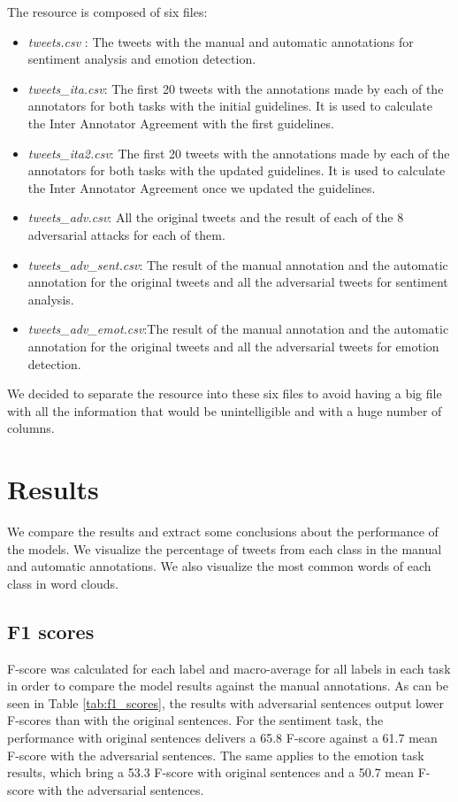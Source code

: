 \documentclass[11pt,a4paper]{article}
\begin{document}
The resource is composed of six files:
\begin{itemize}
    \item \textit{tweets.csv }: The tweets with the manual and automatic annotations for sentiment analysis and emotion detection.
    \item \textit{tweets\_ita.csv}: The first 20 tweets with the annotations made by each of the annotators for both tasks with the initial guidelines. It is used to calculate the Inter Annotator Agreement with the first guidelines.
    \item \textit{tweets\_ita2.csv}:  The first 20 tweets with the annotations made by each of the annotators for both tasks with the updated guidelines. It is used to calculate the Inter Annotator Agreement once we updated the guidelines.
    \item \textit{tweets\_adv.csv}: All the original tweets and the result of each of the 8 adversarial attacks for each of them.
    \item \textit{tweets\_adv\_sent.csv}: The result of the manual annotation and the automatic annotation for the original tweets and all the adversarial tweets for sentiment analysis.
    \item \textit{tweets\_adv\_emot.csv}:The result of the manual annotation and the automatic annotation for the original tweets and all the adversarial tweets for emotion detection.
\end{itemize}

We decided to separate the resource into these six files to avoid having a big file with all the information that would be unintelligible and with a huge number of columns.

\section{Results}

We compare the results and extract some conclusions about the performance of the models. We visualize the percentage of tweets from each class in the manual and automatic annotations. We also visualize the most common words of each class in word clouds.

\subsection{F1 scores}

F-score was calculated for each label and macro-average for all labels in each task in order to compare the model results against the manual annotations. 
As can be seen in Table \ref{tab:f1_scores}, the results with adversarial sentences output lower F-scores than with the original sentences. For the sentiment task, the performance with original sentences delivers a 65.8 F-score against a 61.7 mean F-score with the adversarial sentences. The same applies to the emotion task results, which bring a 53.3 F-score with original sentences and a 50.7 mean F-score with the adversarial sentences.
\end{document}
